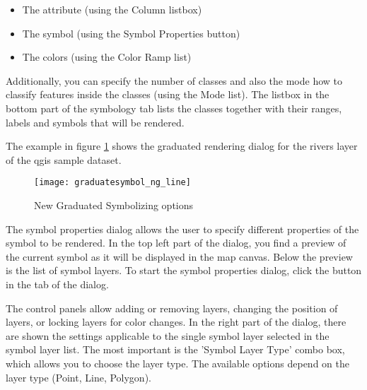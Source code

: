 \begin{itemize}[label=--]
\item The attribute (using the Column listbox)
\item The symbol (using the Symbol Properties button)
\item The colors (using the Color Ramp list)
\end{itemize}

Additionally, you can specify the number of classes and also the mode how to 
classify features inside the classes (using the Mode list). The listbox in the 
bottom part of the symbology tab lists the classes together with their ranges, 
labels and symbols that will be rendered.

The example in figure \ref{fig:gradsymNG} shows the graduated rendering dialog 
for the rivers layer of the qgis sample dataset.

\begin{figure}[ht]
   \centering
   \caption{New Graduated Symbolizing options \nixcaption}\label{fig:gradsymNG}
   \texttt{[image: graduatesymbol\_ng\_line]}
\end{figure}


The symbol properties dialog allows the user to specify different properties of 
the symbol to be rendered. In the top left part of the dialog, you find a preview 
of the current symbol as it will be displayed in the map canvas. Below the preview 
is the list of symbol layers. To start the symbol properties dialog, click the 
 button in the  tab of the
 dialog. 

The control panels allow adding or removing layers, changing the position of layers, 
or locking layers for color changes. In the right part of the dialog, there are 
shown the settings applicable to the single symbol layer selected in the symbol 
layer list. The most important is the 'Symbol Layer Type' combo box, which allows 
you to choose the layer type. The available options depend on the layer type 
(Point, Line, Polygon). 

